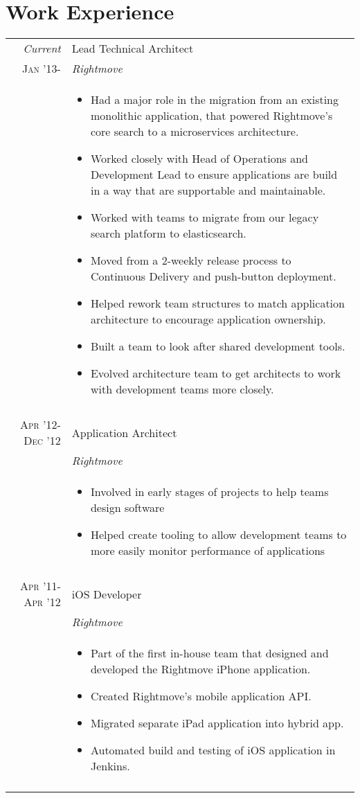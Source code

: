 \documentclass[a4paper,10pt]{article}
\begin{document}
\section{Work Experience}
\begin{tabular}{r|p{10.5cm}}
 \emph{Current} & Lead Technical Architect \\\textsc{Jan '13-}&\emph{Rightmove}\\&
\begin{itemize}[noitemsep]
\item Had a major role in the migration from an existing monolithic application, that powered Rightmove's core search to a microservices architecture.
\item Worked closely with Head of Operations and Development Lead to ensure applications are build in a way that are supportable and maintainable.
\item Worked with teams to migrate from our legacy search platform to elasticsearch.
\item Moved from a 2-weekly release process to Continuous Delivery and push-button deployment.
\item Helped rework team structures to match application architecture to encourage application ownership.
\item Built a team to look after shared development tools.
\item Evolved architecture team to get architects to work with development teams more closely.
\end{itemize}
\\\multicolumn{2}{c}{} \\
 \textsc{Apr '12-Dec '12} & Application Architect \\&\emph{Rightmove}\\&
\begin{itemize}[noitemsep]
\item Involved in early stages of projects to help teams design software
\item Helped create tooling to allow development teams to more easily monitor performance of applications
\end{itemize} 
\\\multicolumn{2}{c}{} \\
 \textsc{Apr '11-Apr '12} & iOS Developer \\&\emph{Rightmove}\\&
\begin{itemize}[noitemsep]
\item Part of the first in-house team that designed and developed the Rightmove iPhone application.
\item Created Rightmove's mobile application API.
\item Migrated separate iPad application into hybrid app.
\item Automated build and testing of iOS application in Jenkins.
\end{itemize} 
\\\multicolumn{2}{c}{} \\
\end{tabular}
\end{document}
